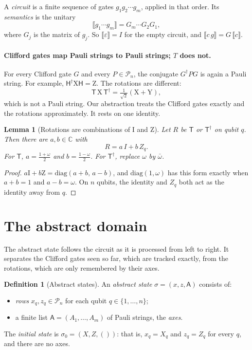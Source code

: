 \documentclass[11pt]{article}
\newtheorem{lemma}[theorem]{Lemma}
\theoremstyle{definition}
\newtheorem{definition}[theorem]{Definition}
\theoremstyle{remark}
\newcommand{\C}{\mathbb{C}}
\newcommand{\Pauli}{\mathcal{P}_n}
\newcommand{\sem}[1]{\llbracket #1 \rrbracket}
\newcommand{\adj}{^{\dagger}}
\newcommand{\Ax}{\mathsf{A}}
\newcommand{\tI}{\mathrm{I}}
\newcommand{\tX}{\mathrm{X}}
\newcommand{\tY}{\mathrm{Y}}
\newcommand{\tZ}{\mathrm{Z}}
\newcommand{\gate}[1]{\mathsf{#1}}
\begin{document}
A \emph{circuit} is a finite sequence of gates $g_1 g_2 \cdots g_m$, applied in that order.
Its \emph{semantics} is the unitary
\[
  \sem{g_1 \cdots g_m} = G_m \cdots G_2 G_1,
\]
where $G_j$ is the matrix of $g_j$. So $\sem{\varepsilon} = I$ for the empty circuit, and
$\sem{c\, g} = G\,\sem{c}$.

\paragraph{Clifford gates map Pauli strings to Pauli strings; $T$ does not.}
For every Clifford gate $G$ and every $P \in \Pauli$, the conjugate $G\adj P G$ is again a
Pauli string. For example, $\gate{H}\adj \tX \gate{H} = \tZ$. The rotations are different:
\[
  \gate{T}\,\tX\,\gate{T}\adj = \tfrac{1}{\sqrt 2}(\tX + \tY),
\]
which is not a Pauli string. Our abstraction treats the Clifford gates exactly and the
rotations approximately. It rests on one identity.

\begin{lemma}[Rotations are combinations of $\tI$ and $\tZ$]\label{lem:rot}
Let $R$ be $\gate{T}$ or $\gate{T}\adj$ on qubit $q$. Then there are $a, b \in \C$ with
\[
  R = a\, I + b\, Z_q .
\]
For $\gate{T}$, $a = \tfrac{1+\omega}{2}$ and $b = \tfrac{1-\omega}{2}$. For $\gate{T}\adj$,
replace $\omega$ by $\bar\omega$.
\end{lemma}

\begin{proof}
$a\tI + b\tZ = \mathrm{diag}(a+b,\, a-b)$, and $\mathrm{diag}(1,\omega)$ has this form
exactly when $a + b = 1$ and $a - b = \omega$. On $n$ qubits, the identity and $Z_q$ both
act as the identity away from $q$.
\end{proof}

\section{The abstract domain}

The abstract state follows the circuit as it is processed from left to right. It
separates the Clifford gates seen so far, which are tracked exactly, from the rotations,
which are only remembered by their axes.

\begin{definition}[Abstract states]
An \emph{abstract state} $\sigma = (x, z, \Ax)$ consists of:
\begin{itemize}[nosep]
  \item \emph{rows} $x_q, z_q \in \Pauli$ for each qubit $q \in \{1, \dots, n\}$;
  \item a finite list $\Ax = (A_1, \dots, A_m)$ of Pauli strings, the \emph{axes}.
\end{itemize}
The \emph{initial state} is $\sigma_0 = (X, Z, ())$: that is, $x_q = X_q$ and $z_q = Z_q$
for every $q$, and there are no axes.
\end{definition}
\end{document}
